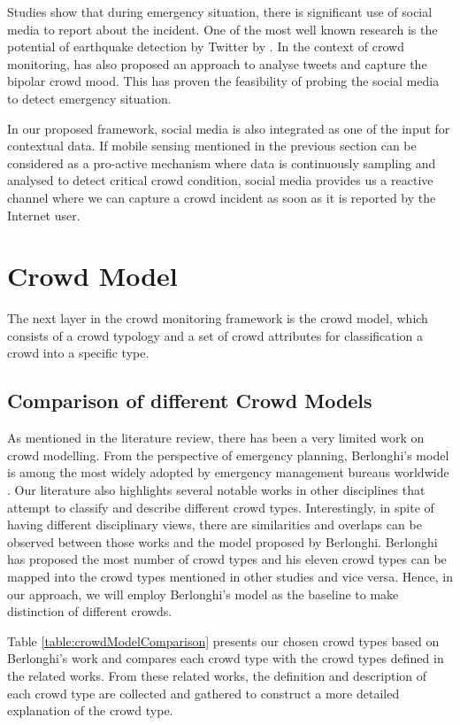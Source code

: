 Studies show that during emergency situation, there is significant use of social media to report about the incident. One of the most well known research is the potential of earthquake detection by Twitter by \citet{Sakaki2010}. In the context of crowd monitoring, \citet{DelirHaghighi2013} has also proposed an approach to analyse tweets and capture the bipolar crowd mood. This has proven the feasibility of probing the social media to detect emergency situation.

In our proposed framework, social media is also integrated as one of the input for contextual data. If mobile sensing mentioned in the previous section can be considered as a pro-active mechanism where data is continuously sampling and analysed to detect critical crowd condition, social media provides us a reactive channel where we can capture a crowd incident as soon as it is reported by the Internet user. 

\section{Crowd Model}

The next layer in the crowd monitoring framework is the crowd model, which consists of a crowd typology and a set of crowd attributes for classification a crowd into a specific type.

\subsection{Comparison of different Crowd Models}
As mentioned in the literature review, there has been a very limited work on crowd modelling. From the perspective of emergency planning, Berlonghi's model is among the most widely adopted by emergency management bureaus worldwide \citep{FEMA2005, EMA1999}. Our literature also highlights several notable works in other disciplines that attempt to classify and describe different crowd types. Interestingly, in spite of having different disciplinary views, there are similarities and overlaps can be observed between those works and the model proposed by Berlonghi. Berlonghi has proposed the most number of crowd types and his eleven crowd types can be mapped into the crowd types mentioned in other studies and vice versa. Hence, in our approach, we will employ Berlonghi's model as the baseline to make distinction of different crowds.

Table \ref{table:crowdModelComparison} presents our chosen crowd types based on Berlonghi's work and compares each crowd type with the crowd types defined in the related works. From these related works, the definition and description of each crowd type are collected and gathered to construct a more detailed explanation of the crowd type.

